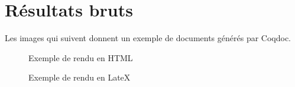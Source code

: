   \section{Résultats bruts}
  \label{results}
  Les images qui suivent donnent un exemple de documents générés par Coqdoc.
  \begin{figure}
  \caption{Exemple de rendu en HTML}
  \end{figure}
  \clearpage
  \begin{figure}
  \caption{Exemple de rendu en LateX}
  \end{figure}
  \clearpage
